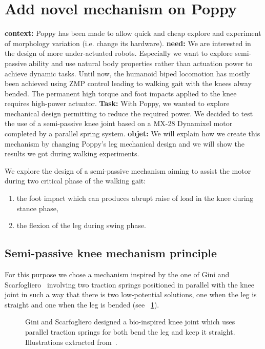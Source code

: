 \newpage
\section{Add novel mechanism on Poppy} %
\label{sec:morphology-add-mechanism}

\textbf{context:} Poppy has been made to allow quick and cheap explore and experiment of morphology variation (i.e. change its hardware).
\textbf{need:} We are interested in the design of more under-actuated robots. Especially we want to explore semi-passive ability and use natural body properties rather than actuation power to achieve dynamic tasks. Until now, the humanoid biped locomotion has mostly been achieved using ZMP control leading to walking gait with the knees alway bended. The permanent high torque and foot impacts applied to the knee requires high-power actuator.
\textbf{Task:} With Poppy, we wanted to explore mechanical design permitting to reduce the required power. We decided to test the use of a semi-passive knee joint based on a MX-28 Dynamixel motor completed by a parallel spring system.
\textbf{objet:} We will explain how we create this mechanism by changing Poppy's leg mechanical design and we will show the results we got during walking experiments.

We explore the design of a semi-passive mechanism aiming to assist the motor during two critical phase of the walking gait:
\begin{enumerate}
    \item the foot impact which can produces abrupt raise of load in the knee during stance phase,
    \item the flexion of the leg during swing phase.
\end{enumerate}

\subsection{Semi-passive knee mechanism principle} %
For this purpose we chose a mechanism inspired by the one of Gini and Scarfogliero~\cite{gini2009new} involving two traction springs positioned in parallel with the knee joint in such a way that there is two low-potential solutions, one when the leg is straight and one when the leg is bended (see \figurename~\ref{fig:Gini_knee}).

\begin{figure}[]
\centering
    \hfil
    \caption{Gini and Scarfogliero designed a bio-inspired knee joint which uses parallel traction springs for both bend the leg and keep it straight. Illustrations extracted from~\cite{gini2009new}.}
    \label{fig:Gini_knee}
\end{figure}

